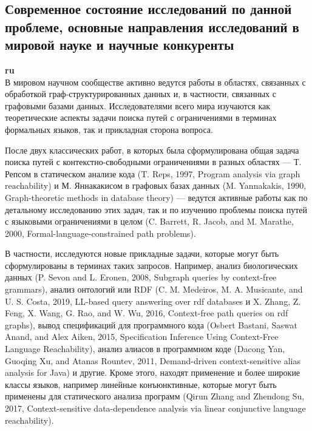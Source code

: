 \documentclass[12pt]{article}  %
\theoremstyle{remark}
\begin{document}
\subsection{Современное состояние исследований по данной проблеме, основные направления исследований в мировой науке и научные конкуренты}

\textbf{ru}\\
%
В мировом научном сообществе активно ведутся работы в областях, связанных с обработкой граф-структурированных данных и, в частности, связанных с графовыми базами данных. Исследователями всего мира изучаются как теоретические аспекты задачи поиска путей с ограничениями в терминах формальных языков, так и прикладная сторона вопроса.

После двух классических работ, в которых была сформулирована общая задача поиска путей с контекстно-свободными ограничениями в разных областях — Т. Репсом в статическом анализе кода (T. Reps, 1997, Program analysis via graph reachability) и М. Яннакакисом в графовых базах данных (M. Yannakakis, 1990, Graph-theoretic methods in database theory) — ведутся активные работы как по детальному исследованию этих задач, так и по изучению проблемы поиска путей с языковыми ограничениями в целом (C. Barrett, R. Jacob, and M. Marathe, 2000, Formal-language-constrained path problems).

В частности, исследуются новые прикладные задачи, которые могут быть сформулированы в терминах таких запросов. Например, анализ биологических данных (P. Sevon and L. Eronen, 2008, Subgraph queries by context-free grammars), анализ онтологий или RDF (C. M. Medeiros, M. A. Musicante, and U. S. Costa, 2019, LL-based query answering over rdf databases и X. Zhang, Z. Feng, X. Wang, G. Rao, and W. Wu, 2016, Context-free path queries on rdf graphs), вывод спецификаций для программного кода (Osbert Bastani, Saswat Anand, and Alex Aiken, 2015, Specification Inference Using Context-Free Language Reachability), анализ алиасов в программном коде (Dacong Yan, Guoqing Xu, and Atanas Rountev, 2011, Demand-driven context-sensitive alias analysis for Java) и другие. Кроме этого, находят применение и более широкие классы языков, например линейные конъюнктивные, которые могут быть применены для статического анализа программ (Qirun Zhang and Zhendong Su, 2017, Context-sensitive data-dependence analysis via linear conjunctive language reachability).
\end{document}
